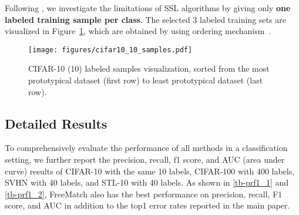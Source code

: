 \documentclass{article} \usepackage{iclr2023_conference,times}
\theoremstyle{plain}
\theoremstyle{definition}
\theoremstyle{remark}
\newcommand{\ourmethod}{FreeMatch\xspace}
\begin{document}
Following \citep{sohn2020fixmatch}, we investigate the limitations of SSL algorithms by giving only \textbf{one labeled training sample per class}. The selected 3 labeled training sets are visualized in Figure~\ref{fig-cifar10}, which are obtained by \citep{sohn2020fixmatch} using ordering mechanism~\citep{carlini2019distribution}.

\begin{figure}[h]
    \centering
    \texttt{[image: figures/cifar10\_10\_samples.pdf]}
    \caption{CIFAR-10 (10) labeled samples visualization, sorted from the most prototypical dataset (first row) to least prototypical dataset (last row).}
    \label{fig-cifar10}
\end{figure}



\subsection{Detailed Results}
\label{append-detail-result}
To comprehensively evaluate the performance of all methods in a classification setting, we further report the precision, recall, f1 score, and AUC (area under curve) results of CIFAR-10 with the same 10 labels, CIFAR-100 with 400 labels, SVHN with 40 labels, and STL-10 with 40 labels.
As shown in \cref{tb-prf1_1} and \ref{tb-prf1_2}, \ourmethod also has the best performance on precision, recall, F1 score, and AUC in addition to the top1 error rates reported in the main paper.
\end{document}
